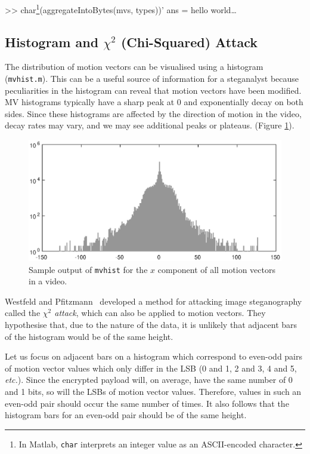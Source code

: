 \documentclass[12pt,british,twoside,notitlepage,usenames,dvipsnames,hypens,final]{report}
\numberwithin{equation}{section}
\numberwithin{figure}{section}
\renewenvironment{alltt}{\vspace{-0.6\baselineskip}\begin{oldalltt}}{\end{oldalltt}\vspace{-0.1\baselineskip}}
\begin{document}
\begin{alltt}
    >> char\footnote{In Matlab, \texttt{char} interprets an integer value as an ASCII-encoded character.}(aggregateIntoBytes(mvs, types))'
    ans = hello world\ldots
\end{alltt}

\subsection{Histogram and $\chi^2$ (Chi-Squared) Attack}

The distribution of motion vectors can be visualised using a histogram (\texttt{mvhist.m}). This can be a useful source of information for a steganalyst because peculiarities in the histogram can reveal that motion vectors have been modified. MV histograms typically have a sharp peak at 0 and exponentially decay on both sides. Since these histograms are affected by the direction of motion in the video, decay rates may vary, and we may see additional peaks or plateaus. (Figure \ref{fig:histogram-example}).

\begin{figure}[tbh]
\centerline{\includegraphics[scale=0.75]{img/histogram-example.eps}}
\caption{Sample output of \texttt{mvhist} for the $x$ component of all motion vectors in a video.}
\label{fig:histogram-example}
\end{figure}

Westfeld and Pfitzmann~\cite{westfeld1999attacks} developed a method for attacking image steganography called the \emph{$\chi^2$ attack}, which can also be applied to motion vectors. They hypothesise that, due to the nature of the data, it is unlikely that adjacent bars of the histogram would be of the same height. 

Let us focus on adjacent bars on a histogram which correspond to even-odd pairs of motion vector values which only differ in the LSB (0 and 1, 2 and 3, 4 and 5, \emph{etc.}). Since the encrypted payload will, on average, have the same number of 0 and 1 bits, so will the LSBs of motion vector values. Therefore, values in such an even-odd pair should occur the same number of times. It also follows that the histogram bars for an even-odd pair should be of the same height.
\end{document}
